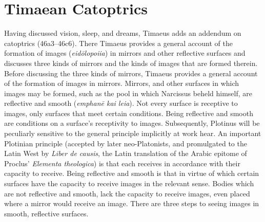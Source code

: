 
\section{Timaean Catoptrics} %
\label{sec:timaen_catoptrics}

Having discussed vision, sleep, and dreams, Timaeus adds an addendum on catoptrics (46a3–46c6). There Timaeus provides a general account of the formation of images (\emph{eidōlopoiia}) in mirrors and other reflective surfaces and discusses three kinds of mirrors and the kinds of images that are formed therein. Before discussing the three kinds of mirrors, Timaeus provides a general account of the formation of images in mirrors. Mirrors, and other surfaces in which images may be formed, such as the pool in which Narcissus beheld himself, are reflective and smooth (\emph{emphanē kai leia}). Not every surface is receptive to images, only surfaces that meet certain conditions. Being reflective and smooth are conditions on a surface's receptivity to images. Subsequently, Plotinus will be peculiarly sensitive to the general principle implicitly at work hear. An important Plotinian principle (accepted by later neo-Platonists, and promulgated to the Latin West by \emph{Liber de causis}, the Latin translation of the Arabic epitome of Proclus' \emph{Elementa theologica}) is that each receives in accordance with their capacity to receive. Being reflective and smooth is that in virtue of which certain surfaces have the capacity to receive images in the relevant sense. Bodies which are not reflective and smooth, lack the capacity to receive images, even placed where a mirror would receive an image. There are three steps to seeing images in smooth, reflective surfaces. 


